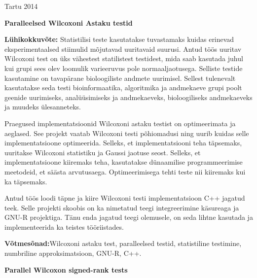 \documentclass[12pt]{article}
\begin{document}
\vfill
\centerline{Tartu 2014}

\newpage
\thispagestyle{empty}
\phantom{Text to fill the page}

\newpage

\noindent\textbf{\large Paralleelsed Wilcoxoni Astaku testid}
\vspace*{3ex}

\noindent\textbf{Lühikokkuvõte:}
Statistilisi teste kasutatakse tuvastamaks kuidas erinevad eksperimentaalsed stiimulid mõjutavad uuritavaid suurusi. Antud töös uuritav Wilcoxoni test on üks vähestest statilistest testidest, mida saab kasutada juhul kui grupi sees olev loomulik varieeruvus pole normaaljaotusega. Selliste testide kasutamine on tavapärane bioloogiliste andmete uurimisel. Sellest tulenevalt kasutatakse seda testi bioinformaatika, algoritmika ja andmekaeve grupi poolt geenide uurimiseks, analüüsimiseks ja andmekaeveks, bioloogiliseks andmekaeveks ja muudeks ülesanneteks.

Praegused implementatsioonid Wilcoxoni astaku testist on optimeerimata ja aeglased. See projekt vaatab Wilcoxoni testi põhiomadusi ning uurib kuidas selle implementatsioone optimeerida. Selleks, et implementatsiooni teha täpsemaks, uuritakse Wilcoxoni statistiku ja Gaussi jaotuse seost. Selleks, et implementatsioone kiiremaks teha, kasutatakse dünaamilise programmeerimise meetodeid, et säästa arvutusaega. Optimeerimisega tehti teste nii kiiremaks kui ka täpsemaks.

Antud töös loodi täpne ja kiire Wilcoxoni testi implementatsioon C++ jagatud teek. Selle projekti skoobis on ka nimetatud teegi integreerimine käsureaga ja GNU-R projektiga. Tänu enda jagatud teegi olemusele, on seda lihtne kasutada ja implementeerida ka teistes tööriistades.
\vspace*{3ex}

\noindent\textbf{Võtmesõnad:}{Wilcoxoni astaku test, paralleelsed testid, statistiline testimine, numbriline approksimatsioon, GNU-R, C++.}
\vspace*{6ex}

\noindent\textbf{\large Parallel Wilcoxon signed-rank tests}
\vspace*{3ex}
\end{document}

